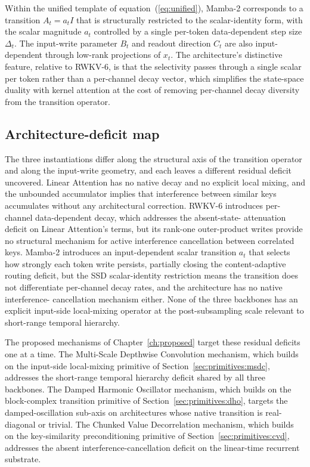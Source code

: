 Within the unified template of equation~(\ref{eq:unified}), Mamba-2
corresponds to a transition $A_{t} = a_{t} I$ that is structurally
restricted to the scalar-identity form, with the scalar magnitude
$a_{t}$ controlled by a single per-token data-dependent step size
$\Delta_{t}$. The input-write parameter $B_{t}$ and readout direction
$C_{t}$ are also input-dependent through low-rank projections of
$x_{t}$. The architecture's distinctive feature, relative to RWKV-6,
is that the selectivity passes through a single scalar per token
rather than a per-channel decay vector, which simplifies the
state-space duality with kernel attention at the cost of removing
per-channel decay diversity from the transition operator.

\subsection{Architecture-deficit map}\label{sec:backbones:deficit}

The three instantiations differ along the structural axis of the
transition operator and along the input-write geometry, and each
leaves a different residual deficit uncovered. Linear Attention has
no native decay and no explicit local mixing, and the unbounded
accumulator implies that interference between similar keys
accumulates without any architectural correction. RWKV-6 introduces
per-channel data-dependent decay, which addresses the absent-state-
attenuation deficit on Linear Attention's terms, but its rank-one
outer-product writes provide no structural mechanism for active
interference cancellation between correlated keys. Mamba-2 introduces
an input-dependent scalar transition $a_{t}$ that selects how
strongly each token write persists, partially closing the
content-adaptive routing deficit, but the SSD scalar-identity
restriction means the transition does not differentiate per-channel
decay rates, and the architecture has no native interference-
cancellation mechanism either. None of the three backbones has an
explicit input-side local-mixing operator at the post-subsampling
scale relevant to short-range temporal hierarchy.

The proposed mechanisms of Chapter~\ref{ch:proposed} target these
residual deficits one at a time. The Multi-Scale Depthwise
Convolution mechanism, which builds on the input-side local-mixing
primitive of Section~\ref{sec:primitives:msdc}, addresses the
short-range temporal hierarchy deficit shared by all three backbones.
The Damped Harmonic Oscillator mechanism, which builds on the
block-complex transition primitive of
Section~\ref{sec:primitives:dho}, targets the damped-oscillation
sub-axis on architectures whose native transition is real-diagonal
or trivial. The Chunked Value Decorrelation mechanism, which builds
on the key-similarity preconditioning primitive of
Section~\ref{sec:primitives:cvd}, addresses the absent
interference-cancellation deficit on the linear-time recurrent
substrate.

